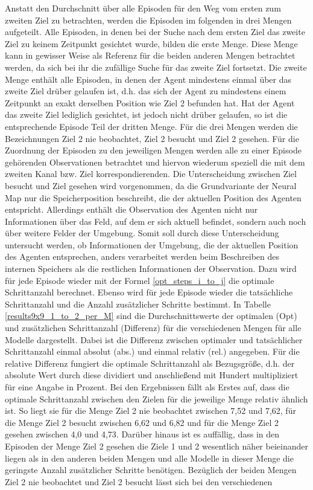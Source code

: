 Anstatt den Durchschnitt über alle Episoden für den Weg vom ersten zum zweiten Ziel zu betrachten, werden die Episoden im folgenden in drei Mengen aufgeteilt. Alle Episoden, in denen bei der Suche nach dem ersten Ziel das zweite Ziel zu keinem Zeitpunkt gesichtet wurde, bilden die erste Menge. Diese Menge kann in gewisser Weise als Referenz für die beiden anderen Mengen betrachtet werden, da sich bei ihr die zufällige Suche für das zweite Ziel fortsetzt. Die zweite Menge enthält alle Episoden, in denen der Agent mindestens einmal über das zweite Ziel drüber gelaufen ist, d.h. das sich der Agent zu mindestens einem Zeitpunkt an exakt derselben Position wie Ziel 2 befunden hat. Hat der Agent das zweite Ziel lediglich gesichtet, ist jedoch nicht drüber gelaufen, so ist die entsprechende Episode Teil der dritten Menge. Für die drei Mengen werden die Bezeichnungen \glqq Ziel 2 nie beobachtet\grqq{}, \glqq Ziel 2 besucht\grqq{} und \glqq Ziel 2 gesehen\grqq{}. Für die Zuordnung der Episoden zu den jeweiligen Mengen werden alle zu einer Episode gehörenden Observationen betrachtet und hiervon wiederum speziell die mit dem zweiten Kanal bzw. Ziel korrespondierenden. Die Unterscheidung zwischen \glqq Ziel\grqq{} besucht und \glqq Ziel\grqq{} gesehen wird vorgenommen, da die Grundvariante der Neural Map nur die Speicherposition beschreibt, die der aktuellen Position des Agenten entspricht. Allerdings enthält die Observation des Agenten nicht nur Informationen über das Feld, auf dem er sich aktuell befindet, sondern auch noch über weitere Felder der Umgebung. Somit soll durch diese Unterscheidung untersucht werden, ob Informationen der Umgebung, die der aktuellen Position des Agenten entsprechen, anders verarbeitet werden beim Beschreiben des internen Speichers als die restlichen Informationen der Observation. Dazu wird für jede Episode wieder mit der Formel \ref{opt_steps_i_to_j} die optimale Schrittanzahl berechnet. Ebenso wird für jede Episode wieder die tatsächliche Schrittanzahl und die Anzahl zusätzlicher Schritte bestimmt. In Tabelle \ref{results9x9_1_to_2_per_M} sind die Durchschnittswerte der optimalen (Opt) und zusätzlichen Schrittanzahl (Differenz) für die verschiedenen Mengen für alle Modelle dargestellt. Dabei ist die Differenz zwischen optimaler und tatsächlicher Schrittanzahl einmal absolut (abs.) und einmal relativ (rel.) angegeben. Für die relative Differenz fungiert die optimale Schrittanzahl als Bezugsgröße, d.h. der absolute Wert durch diese dividiert und anschließend mit Hundert multipliziert für eine Angabe in Prozent. Bei den Ergebnissen fällt als Erstes auf, dass die optimale Schrittanzahl zwischen den Zielen für die jeweilige Menge relativ ähnlich ist. So liegt sie für die Menge \glqq Ziel 2 nie beobachtet\grqq{} zwischen 7,52 und 7,62, für die Menge \glqq Ziel 2 besucht\grqq{} zwischen 6,62 und 6,82 und für die Menge \glqq Ziel 2 gesehen\grqq{} zwischen 4,0 und 4,73. Darüber hinaus ist es auffällig, dass in den Episoden der Menge \glqq Ziel 2 gesehen\grqq{} die Ziele 1 und 2 wesentlich näher beieinander liegen als in den anderen beiden Mengen und alle Modelle in dieser Menge die geringste Anzahl zusätzlicher Schritte benötigen. Bezüglich der beiden Mengen \glqq Ziel 2 nie beobachtet\grqq{} und \glqq Ziel 2 besucht\grqq{} lässt sich bei den verschiedenen 